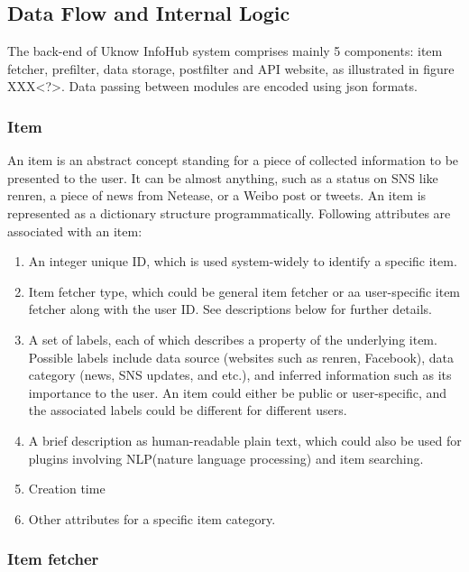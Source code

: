 \subsection{Data Flow and Internal Logic}

The back-end of Uknow InfoHub system comprises mainly 5 components: item
fetcher, prefilter, data storage, postfilter and API website, as
illustrated in figure XXX\textless{}?\textgreater{}.  %
Data passing between modules are encoded using json formats.

\subsubsection{Item}

An item is an abstract concept standing for a piece of collected
information to be presented to the user. It can be almost anything, such
as a status on SNS like renren, a piece of news from Netease, or a Weibo post
or tweets. An item is represented as a dictionary structure
programmatically. Following attributes are associated with an item:

\begin{enumerate}
\def\labelenumi{\arabic{enumi}.}
\itemsep1pt\parskip0pt
\item
  An integer unique ID, which is used system-widely to identify a
  specific item.
\item
  Item fetcher type, which could be general item fetcher or aa
  user-specific item fetcher along with the user ID. See descriptions
  below for further details.
\item
  A set of labels, each of which describes a property of the underlying
  item. Possible labels include data source (websites such as renren,
  Facebook), data category (news, SNS updates, and etc.), and inferred
  information such as its importance to the user. An item could either
  be public or user-specific, and the associated labels could be
  different for different users.
\item
  A brief description as human-readable plain text, which could also be
  used for plugins involving NLP(nature language processing) and item
  searching.
\item
  Creation time
\item
  Other attributes for a specific item category.
\end{enumerate}

\subsubsection{Item fetcher}

